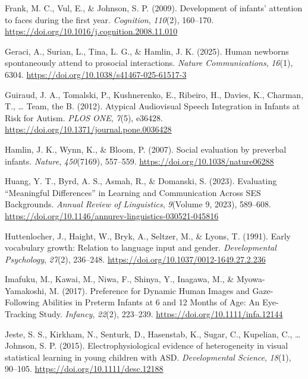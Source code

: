 \documentclass[
  english,
  man,floatsintext]{apa6}
\newlength{\cslhangindent}
\newenvironment{CSLReferences}[2] %
 {\begin{list}{}{%
  \setlength{\itemindent}{0pt}
  \setlength{\leftmargin}{0pt}
  \setlength{\parsep}{0pt}
  \ifodd #1
   \setlength{\leftmargin}{\cslhangindent}
   \setlength{\itemindent}{-1\cslhangindent}
  \fi
  \setlength{\itemsep}{#2\baselineskip}}}
 {\end{list}}
\begin{document}
\begin{CSLReferences}{1}{0}
Frank, M. C., Vul, E., \& Johnson, S. P. (2009). Development of infants' attention to faces during the first year. \emph{Cognition}, \emph{110}(2), 160--170. \url{https://doi.org/10.1016/j.cognition.2008.11.010}

Geraci, A., Surian, L., Tina, L. G., \& Hamlin, J. K. (2025). Human newborns spontaneously attend to prosocial interactions. \emph{Nature Communications}, \emph{16}(1), 6304. \url{https://doi.org/10.1038/s41467-025-61517-3}

{Guiraud, J. A., Tomalski, P., Kushnerenko, E., Ribeiro, H., Davies, K., Charman, T., \ldots{} Team, the B.} (2012). Atypical {Audiovisual Speech Integration} in {Infants} at {Risk} for {Autism}. \emph{PLOS ONE}, \emph{7}(5), e36428. \url{https://doi.org/10.1371/journal.pone.0036428}

Hamlin, J. K., Wynn, K., \& Bloom, P. (2007). Social evaluation by preverbal infants. \emph{Nature}, \emph{450}(7169), 557--559. \url{https://doi.org/10.1038/nature06288}

Huang, Y. T., Byrd, A. S., Asmah, R., \& Domanski, S. (2023). Evaluating {``{Meaningful Differences}''} in {Learning} and {Communication Across SES Backgrounds}. \emph{Annual Review of Linguistics}, \emph{9}(Volume 9, 2023), 589--608. \url{https://doi.org/10.1146/annurev-linguistics-030521-045816}

Huttenlocher, J., Haight, W., Bryk, A., Seltzer, M., \& Lyons, T. (1991). Early vocabulary growth: {Relation} to language input and gender. \emph{Developmental Psychology}, \emph{27}(2), 236--248. \url{https://doi.org/10.1037/0012-1649.27.2.236}

Imafuku, M., Kawai, M., Niwa, F., Shinya, Y., Inagawa, M., \& Myowa-Yamakoshi, M. (2017). Preference for {Dynamic Human Images} and {Gaze-Following Abilities} in {Preterm Infants} at 6 and 12 {Months} of {Age}: {An Eye-Tracking Study}. \emph{Infancy}, \emph{22}(2), 223--239. \url{https://doi.org/10.1111/infa.12144}

Jeste, S. S., Kirkham, N., Senturk, D., Hasenstab, K., Sugar, C., Kupelian, C., \ldots{} Johnson, S. P. (2015). Electrophysiological evidence of heterogeneity in visual statistical learning in young children with {ASD}. \emph{Developmental Science}, \emph{18}(1), 90--105. \url{https://doi.org/10.1111/desc.12188}


\end{CSLReferences}
\end{document}
